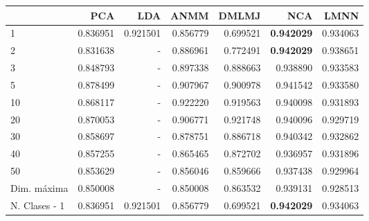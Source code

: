 \begin{tabular}{lrrrrrr}
\toprule
{} &       PCA &       LDA &      ANMM &     DMLMJ &       NCA &           LMNN \\
\midrule
1             &  0.836951 &  0.921501 &  0.856779 &  0.699521 &  \textbf{0.942029} & 0.934063 \\
2             &  0.831638 &  -        &  0.886961 &  0.772491 &  \textbf{0.942029} & 0.938651 \\
3             &  0.848793 &  -        &  0.897338 &  0.888663 &  0.938890 & 0.933583 \\
5             &  0.878499 &  -        &  0.907967 &  0.900978 &  0.941542 & 0.933580 \\
10            &  0.868117 &  -        &  0.922220 &  0.919563 &  0.940098 & 0.931893 \\
20            &  0.870053 &  -        &  0.906771 &  0.921748 &  0.940096 & 0.929719 \\
30            &  0.858697 &  -        &  0.878751 &  0.886718 &  0.940342 & 0.932862 \\
40            &  0.857255 &  -        &  0.865465 &  0.872702 &  0.936957 & 0.931896 \\
50            &  0.853629 &  -        &  0.856046 &  0.859666 &  0.937438 & 0.929964 \\
Dim. máxima   &  0.850008 &  -        &  0.850008 &  0.863532 &  0.939131 & 0.928513 \\
N. Clases - 1 &  0.836951 &  0.921501 &  0.856779 &  0.699521 &  \textbf{0.942029} & 0.934063 \\
\bottomrule
\end{tabular}
